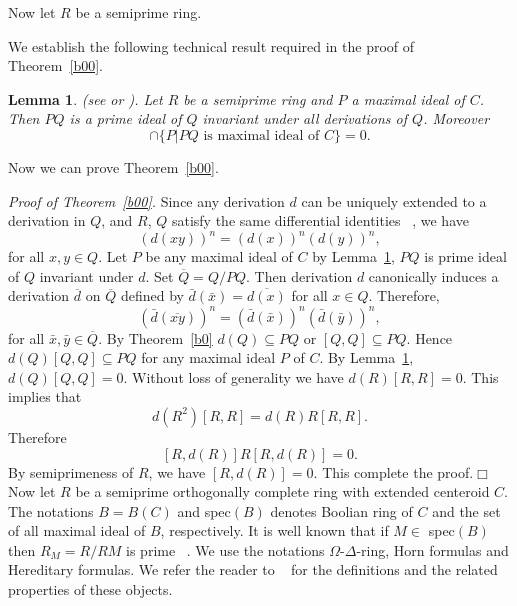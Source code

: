 \documentclass[12pt]{amsart}
\newtheorem{lem}[thm]{Lemma}
\theoremstyle{definition}
\theoremstyle{remark}
\begin{document}
 Now let $R$ be a  semiprime ring.

 \noindent
 We establish the following technical result required
 in the proof of Theorem~\ref{b00}.

\begin{lem}\label{b5}
\emph{(see \cite[Lemma 1 and Theorem 1]{a01} or \cite[pages 31-32]{a4})}.
 Let $ R $ be a semiprime ring
 and $P$ a maximal ideal of $ C $.
 Then $PQ$ is a prime ideal of $Q$ invariant
 under all derivations of $Q$. Moreover
 $$\cap\{ P| PQ \text{ is maximal ideal of } C\}=0.$$

\end{lem}

\smallskip
\noindent
 Now we can prove Theorem~\ref{b00}.

\vspace{3mm}
\emph{Proof of Theorem~\ref{b00}.}  Since any derivation $d$
 can be uniquely extended to  a derivation in
 $Q$, and   $R$, $Q$ satisfy the same differential identities
 ~\cite[Theorem 3]{a4}, we have
 $$(d(xy))^n=(d(x))^n(d(y))^n,$$
 for all $x,y \in Q$.
 Let $ P $ be any maximal ideal of $C$ by Lemma~\ref{b5},
 $PQ$ is prime ideal of $Q$ invariant under $ d $.
 Set $\overline{Q}=Q/{PQ}$.
 Then derivation $ d $ canonically induces a derivation
 $\overline{d}$ on $\overline{Q}$ defined by
 $\bar{d}(\bar{x})=\overline{d(x)}$
 for all $ x \in Q$.
 Therefore,
 $$(\bar{d}(\overline{xy}))^n=(\bar {d}(\bar {x}))^n(\bar {d}(\bar {y}))^n,$$
 for all $\bar{x}, \bar{y} \in \overline{Q}$.
 By Theorem~\ref{b0} $d(Q)\subseteq PQ$ or $[Q,Q]\subseteq PQ$.
 Hence $d(Q)[Q,Q]\subseteq PQ$ for any maximal ideal $P$ of $C$.
 By Lemma~\ref{b5}, $d(Q)[Q,Q]=0$.
 Without loss of generality we have $d(R)[R,R]=0$.
 This implies that $$d(R^2)[R,R]=d(R)R[R,R].$$
 Therefore
 $$[R,d(R)]R[R,d(R)]=0.$$
 By semiprimeness of $ R $, we have  $[R,d(R)]=0 $.
 This complete the proof.\hfill $\Box$\\

 Now let $R$ be a semiprime orthogonally complete ring with
 extended centeroid $C$. The notations $B=B(C)$
 and spec$(B)$ denotes Boolian ring of $C$ and the
 set of all maximal ideal of $B$, respectively.
 It is well known that if $M\in$ spec$(B)$ then $R_{M}=R/RM$
 is prime ~\cite[Theorem 3.2.7]{a0}. We use the notations
 $\Omega$-$\Delta$-ring,
 Horn formulas and Hereditary formulas. We
 refer the reader to ~\cite[ pages 37, 38, 43, 120]{a0}
 for the definitions and the related properties
 of these objects.\\
\end{document}
